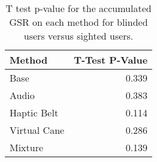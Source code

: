 
\begin{table}[!htb]
\centering
\caption{T test p-value for the accumulated GSR on each method for blinded users versus sighted users.}
\label{tab:ttest_gsr_sum}
\begin{tabular}{lr}
\toprule
      Method &  T-Test P-Value \\
\midrule
        Base &           0.339 \\
       Audio &           0.383 \\
 Haptic Belt &           0.114 \\
Virtual Cane &           0.286 \\
     Mixture &           0.139 \\
\bottomrule
\end{tabular}
\end{table}

